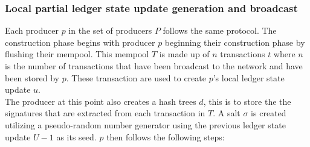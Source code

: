 \documentclass{article}
\begin{document}
\subsubsection{Local partial ledger state update generation and broadcast}

Each producer $p$ in the set of producers $P$ follows the same protocol. The construction phase begins with producer $p$ beginning their construction phase by flushing their mempool. This mempool $T$ is made up of $n$ transactions $t$  where $n$ is the number of transactions that have been broadcast to the network and have been stored by $p$. These transaction are used to create $p$'s local ledger state update $u$.  \\

The producer at this point also creates a hash trees $d$, this is to store the the signatures that are extracted from each transaction in $T$. A salt $\sigma$ is created utilizing a pseudo-random number generator using the previous ledger state update $U-1$ as its seed. $p$ then follows the following steps: 
\end{document}
